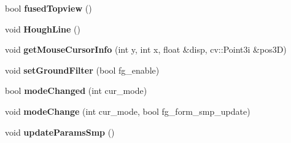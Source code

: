 \begin{DoxyCompactItemize}
\item 
\hypertarget{classstereo__vision_aa5823b967f14aa5fe353f0f7c983bbb7}{}bool {\bfseries fused\+Topview} ()\label{classstereo__vision_aa5823b967f14aa5fe353f0f7c983bbb7}

\item 
\hypertarget{classstereo__vision_a35f0b49b1839f2c05ee1c4bf381f7a2a}{}void {\bfseries Hough\+Line} ()\label{classstereo__vision_a35f0b49b1839f2c05ee1c4bf381f7a2a}

\item 
\hypertarget{classstereo__vision_a836c0c934401f062619d5d27ff763400}{}void {\bfseries get\+Mouse\+Cursor\+Info} (int y, int x, float \&disp, cv\+::\+Point3i \&pos3\+D)\label{classstereo__vision_a836c0c934401f062619d5d27ff763400}

\item 
\hypertarget{classstereo__vision_a77a08312396f01ff9e96b80db9636a83}{}void {\bfseries set\+Ground\+Filter} (bool fg\+\_\+enable)\label{classstereo__vision_a77a08312396f01ff9e96b80db9636a83}

\item 
\hypertarget{classstereo__vision_a57546410422adbce47c7e0db2f78261b}{}bool {\bfseries mode\+Changed} (int cur\+\_\+mode)\label{classstereo__vision_a57546410422adbce47c7e0db2f78261b}

\item 
\hypertarget{classstereo__vision_aa75b4dad19544a401f59aa527dd54697}{}void {\bfseries mode\+Change} (int cur\+\_\+mode, bool fg\+\_\+form\+\_\+smp\+\_\+update)\label{classstereo__vision_aa75b4dad19544a401f59aa527dd54697}

\item 
\hypertarget{classstereo__vision_a8ec3ea771d16660c9cd28ad6a451e2f8}{}void {\bfseries update\+Params\+Smp} ()\label{classstereo__vision_a8ec3ea771d16660c9cd28ad6a451e2f8}

\end{DoxyCompactItemize}
